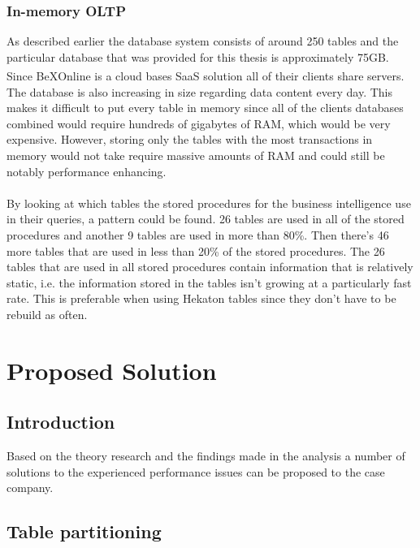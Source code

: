 \documentclass{cslthse-msc}
\newcommand{\bex}{BeX\textsuperscript{\textregistered}}
\begin{document}
\subsection{In-memory OLTP}
As described earlier the database system consists of around 250 tables and the particular database that was provided for this thesis is approximately 75GB. Since \bex Online is a cloud bases SaaS solution all of their clients share servers. The database is also increasing in size regarding data content every day. This makes it difficult to put every table in memory since all of the clients databases combined would require hundreds of gigabytes of RAM, which would be very expensive. However, storing only the tables with the most transactions in memory would not take require massive amounts of RAM and could still be notably performance enhancing.
\\\\
By looking at which tables the stored procedures for the business intelligence use in their queries, a pattern could be found. 26 tables are used in all of the stored procedures and another 9 tables are used in more than 80\%. Then there's 46 more tables that are used in less than 20\% of the stored procedures. The 26 tables that are used in all stored procedures contain information that is relatively static, i.e. the information stored in the tables isn't growing at a particularly fast rate. This is preferable when using Hekaton tables since they don't have to be rebuild as often.

\chapter{Proposed Solution}\label{sec:proposedsoluton}
\section{Introduction}
Based on the theory research and the findings made in the analysis a number of solutions to the experienced performance issues can be proposed to the case company.

\section{Table partitioning}
\cite{tablepartitioning}
\end{document}
